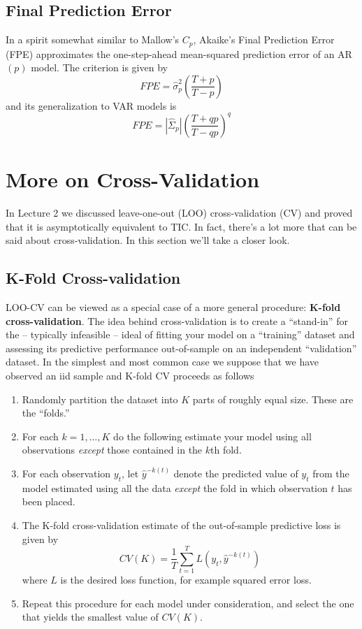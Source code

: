 \subsection{Final Prediction Error}
In a spirit somewhat similar to Mallow's $C_p$, Akaike's Final Prediction Error (FPE) approximates the one-step-ahead mean-squared prediction error of an AR$(p)$ model. The criterion is given by
	$$FPE = \widehat{\sigma}_p^2\left(\frac{T+p}{T-p} \right)$$
and its generalization to VAR models is 
$$FPE = \left| \widehat{\Sigma}_p \right| \left( \frac{T + qp}{T - qp}\right)^q$$



\section{More on Cross-Validation}
In Lecture 2 we discussed leave-one-out (LOO) cross-validation (CV) and proved that it is asymptotically equivalent to TIC. In fact, there's a lot more that can be said about cross-validation. In this section we'll take a closer look.

\subsection{K-Fold Cross-validation}
LOO-CV can be viewed as a special case of a more general procedure: \textbf{K-fold cross-validation}. The idea behind cross-validation is to create a ``stand-in'' for the -- typically infeasible -- ideal of fitting your model on a ``training'' dataset and assessing its predictive performance out-of-sample on an independent ``validation'' dataset. In the simplest and most common case we suppose that we have observed an iid sample and K-fold CV proceeds as follows
	\begin{enumerate}
		\item Randomly partition the dataset into $K$ parts of roughly equal size. These are the ``folds.''
		\item For each $k = 1, \hdots, K$ do the following estimate your model using all observations \emph{except} those contained in the $k$th fold. 
		\item For each observation $y_t$, let $\widehat{y}^{-k(t)}$ denote the predicted value of $y_t$ from the model estimated using all the data \emph{except} the fold in which observation $t$ has been placed.
		\item The K-fold cross-validation estimate of the out-of-sample predictive loss is given by
			$$CV(K) = \frac{1}{T}\sum_{t=1}^T L\left(y_t, \widehat{y}^{-k(t)}\right)$$
		where $L$ is the desired loss function, for example squared error loss.
		\item Repeat this procedure for each model under consideration, and select the one that yields the smallest value of $CV(K)$.
	\end{enumerate}

